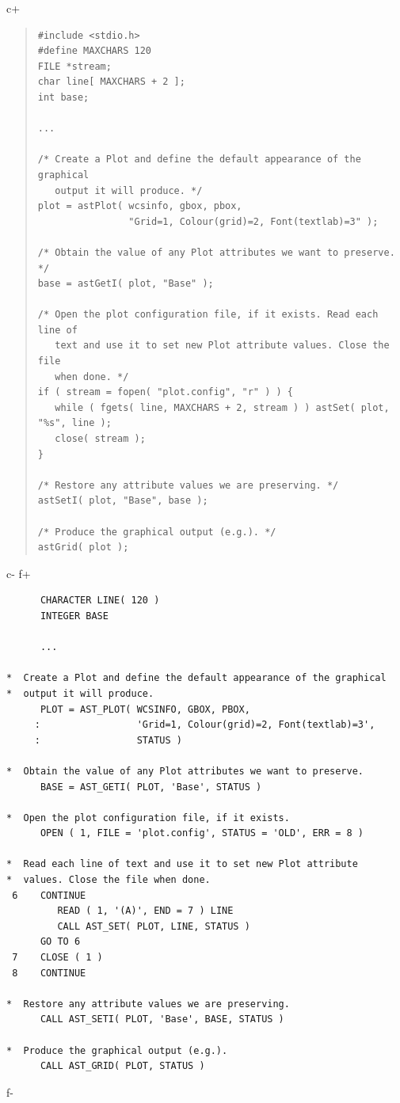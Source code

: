 \documentclass[twoside,11pt]{article}
\begin{document}
c+
\begin{quote}
\small
\begin{verbatim}
#include <stdio.h>
#define MAXCHARS 120
FILE *stream;
char line[ MAXCHARS + 2 ];
int base;

...

/* Create a Plot and define the default appearance of the graphical
   output it will produce. */
plot = astPlot( wcsinfo, gbox, pbox,
                "Grid=1, Colour(grid)=2, Font(textlab)=3" );

/* Obtain the value of any Plot attributes we want to preserve. */
base = astGetI( plot, "Base" );

/* Open the plot configuration file, if it exists. Read each line of
   text and use it to set new Plot attribute values. Close the file
   when done. */
if ( stream = fopen( "plot.config", "r" ) ) {
   while ( fgets( line, MAXCHARS + 2, stream ) ) astSet( plot, "%s", line );
   close( stream );
}

/* Restore any attribute values we are preserving. */
astSetI( plot, "Base", base );

/* Produce the graphical output (e.g.). */
astGrid( plot );
\end{verbatim}
\normalsize
\end{quote}
c-
f+
\small
\begin{verbatim}
      CHARACTER LINE( 120 )
      INTEGER BASE

      ...

*  Create a Plot and define the default appearance of the graphical
*  output it will produce.
      PLOT = AST_PLOT( WCSINFO, GBOX, PBOX,
     :                 'Grid=1, Colour(grid)=2, Font(textlab)=3',
     :                 STATUS )

*  Obtain the value of any Plot attributes we want to preserve.
      BASE = AST_GETI( PLOT, 'Base', STATUS )

*  Open the plot configuration file, if it exists.
      OPEN ( 1, FILE = 'plot.config', STATUS = 'OLD', ERR = 8 )

*  Read each line of text and use it to set new Plot attribute
*  values. Close the file when done.
 6    CONTINUE
         READ ( 1, '(A)', END = 7 ) LINE
         CALL AST_SET( PLOT, LINE, STATUS )
      GO TO 6
 7    CLOSE ( 1 )
 8    CONTINUE

*  Restore any attribute values we are preserving.
      CALL AST_SETI( PLOT, 'Base', BASE, STATUS )

*  Produce the graphical output (e.g.).
      CALL AST_GRID( PLOT, STATUS )
\end{verbatim}
\normalsize
f-
\end{document}
